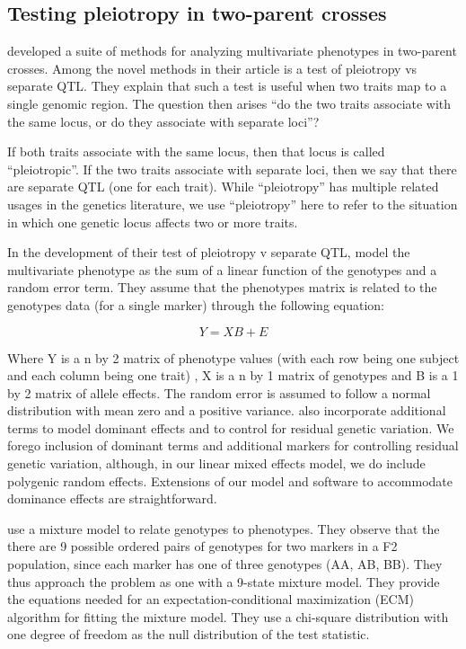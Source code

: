 \documentclass[]{article}\usepackage[]{graphicx}\usepackage[]{color}
\begin{document}





\subsection{Testing pleiotropy in two-parent crosses}

\citet{jiang1995multiple} developed a suite of methods for analyzing multivariate phenotypes in
two-parent crosses.
Among the novel methods in their article is a test of pleiotropy vs separate QTL.
They explain that such a test is useful when two traits map to a single genomic region.
The question then arises ``do the two traits associate with the same locus, or do they associate with separate loci''?

If both traits associate with the same locus, then that locus is called ``pleiotropic''. If the two traits associate with separate loci, then we say that there are separate QTL (one for each trait). While ``pleiotropy'' has multiple related usages in the genetics literature, we use ``pleiotropy'' here to refer to the situation in which one genetic locus affects two or more traits. 

In the development of their test of pleiotropy v separate QTL, \citet{jiang1995multiple} model
the multivariate phenotype as the sum of a linear function of the genotypes and a random error term. They assume that the phenotypes matrix is related to the genotypes data (for a single marker) through the following equation:


\begin{equation}
Y = XB + E
\end{equation}


\noindent Where Y is a n by 2 matrix of phenotype values (with each row being one subject and each column being one trait)
, X is a n by 1 matrix of genotypes and B is a 1 by 2 matrix of allele effects.
The random error is assumed to follow a normal distribution with mean zero and a positive variance.
\citet{jiang1995multiple} also incorporate additional terms to model dominant effects and to
control for residual genetic variation.
We forego inclusion of dominant terms and additional markers for controlling residual
genetic variation, although, in our linear mixed effects model, we do include polygenic random
effects. 
Extensions of our model and software to accommodate dominance effects are straightforward.


\citet{jiang1995multiple} use a mixture model to relate genotypes to phenotypes. 
They observe that the there are 9 possible ordered pairs of genotypes for two markers in a F2 population, since each marker has one of three genotypes (AA, AB, BB).
They thus approach the problem as one with a 9-state mixture model. 
They provide the equations needed for an expectation-conditional maximization
(ECM) algorithm for fitting the mixture model.
They use a chi-square distribution with one degree of freedom as the
null distribution of the test statistic. 
\end{document}
